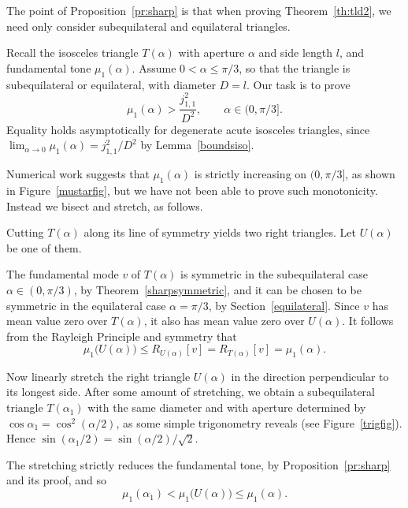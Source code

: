 \documentclass[11pt,reqno]{amsart}
\numberwithin{equation}{section}
\begin{document}
The point of Proposition~\ref{pr:sharp} is that when proving
Theorem~\ref{th:tld2}, we need only consider subequilateral and equilateral
triangles.

Recall the isosceles triangle $T(\alpha)$ with aperture $\alpha$
and side length $l$, and fundamental tone $\mu_1(\alpha)$. Assume
$0 < \alpha \leq \pi/3$, so that the triangle is subequilateral or
equilateral, with diameter $D=l$. Our task is to prove
\begin{equation} \label{eq:isos}
\mu_1(\alpha) > \frac{j_{1,1}^2}{D^2} , \qquad \alpha \in (0,\pi/3] .
\end{equation}
Equality holds asymptotically for degenerate acute isosceles triangles, since $\lim_{\alpha \to 0} \mu_1(\alpha) = j_{1,1}^2/D^2$ by Lemma~\ref{boundsiso}.

Numerical work suggests that $\mu_1(\alpha)$ is strictly increasing on
$(0,\pi/3]$, as shown in Figure~\ref{mustarfig}, but we have not been able to prove such monotonicity. Instead we bisect and stretch, as follows.

Cutting $T(\alpha)$ along its line of symmetry yields two right
triangles. Let $U(\alpha)$ be one of them.

The fundamental mode $v$ of $T(\alpha)$ is symmetric in the subequilateral case $\alpha \in (0,\pi/3)$, by Theorem~\ref{sharpsymmetric}, and it can be chosen to be symmetric in the equilateral case $\alpha=\pi/3$, by Section~\ref{equilateral}. Since $v$ has mean value zero over
$T(\alpha)$, it also has mean value zero over $U(\alpha)$. It follows from the Rayleigh Principle and symmetry that
\[
\mu_1 \big( U(\alpha) \big) \leq R_{U(\alpha)}[v] = R_{T(\alpha)}[v] = \mu_1(\alpha) .
\]

Now linearly stretch the right triangle $U(\alpha)$ in the direction
perpendicular to its longest side. After some amount of stretching, we
obtain a subequilateral triangle $T(\alpha_1)$ with the same diameter and with aperture determined by $\cos \alpha_1 = \cos^2 (\alpha/2)$, as some simple trigonometry reveals (see Figure~\ref{trigfig}).
Hence $\sin(\alpha_1/2) = \sin(\alpha/2)/\sqrt{2}$.

The stretching strictly reduces the fundamental tone, by Proposition~\ref{pr:sharp} and its proof, and so
\[
\mu_1(\alpha_1) < \mu_1 \big( U(\alpha) \big) \leq \mu_1(\alpha) .
\]
\end{document}
